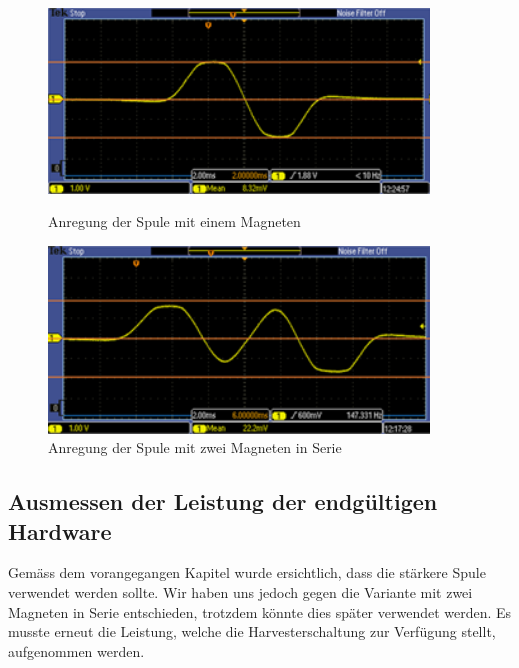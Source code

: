 \begin{figure}[ht]
 \begin{minipage}[t]{0.5\textwidth}
  \includegraphics[width=0.9\textwidth]{3Vorgehen/imag/zweiMagneteInSerie_links.png}
  \caption{Anregung der Spule mit einem Magneten}
  \label{zweiMagneteInSerie} 
 \end{minipage}
 \begin{minipage}[t]{0.5\textwidth}
  \includegraphics[width=0.9\textwidth]{3Vorgehen/imag/zweiMagneteInSerie_rechts.png}
  \caption{Anregung der Spule mit zwei Magneten in Serie}
 \end{minipage}
\end{figure}


\subsection{Ausmessen der Leistung der endgültigen Hardware}

Gemäss dem vorangegangen Kapitel  wurde ersichtlich, dass die stärkere Spule verwendet werden sollte. Wir haben uns jedoch gegen die Variante mit zwei Magneten in Serie entschieden, trotzdem könnte dies später verwendet werden. Es musste erneut die Leistung, welche die Harvesterschaltung zur Verfügung stellt, aufgenommen werden.


